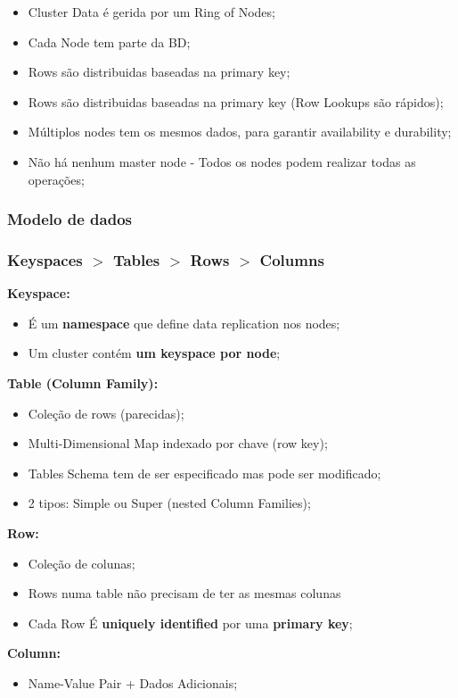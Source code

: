 \documentclass{article}
\begin{document}
\begin{itemize}
  \item Cluster Data é gerida por um Ring of Nodes;
  \item Cada Node tem parte da BD;
  \item Rows são distribuidas baseadas na primary key;
  \item Rows são distribuidas baseadas na primary key (Row Lookups são rápidos);
  \item Múltiplos nodes tem os mesmos dados, para garantir availability e durability;
  \item Não há nenhum master node - Todos os nodes podem realizar todas as operações;
\end{itemize}

\pagebreak

\subsubsection{Modelo de dados}
\subsubsection*{Keyspaces $>$ Tables $>$ Rows $>$ Columns}

\begin{flushleft}
  \textbf{Keyspace:}
  \begin{itemize}
    \item É um \textbf{namespace} que define data replication nos nodes;
    \item Um cluster contém \textbf{um keyspace por node};
  \end{itemize}

  \vspace{2mm}

  \textbf{Table (Column Family):}
  \begin{itemize}
    \item Coleção de rows (parecidas);
    \item Multi-Dimensional Map indexado por chave (row key);
    \item Tables Schema tem de ser especificado mas pode ser modificado;
    \item 2 tipos: Simple ou Super (nested Column Families);
  \end{itemize}

  \vspace{2mm}
  
  \textbf{Row:}
  \begin{itemize}
    \item Coleção de colunas;
    \item Rows numa table não precisam de ter as mesmas colunas
    \item Cada Row É \textbf{uniquely identified} por uma \textbf{primary key};
  \end{itemize}

  \vspace{2mm}

  \textbf{Column:}
  \begin{itemize}
    \item Name-Value Pair + Dados Adicionais;
  \end{itemize}
\end{flushleft}
\end{document}
